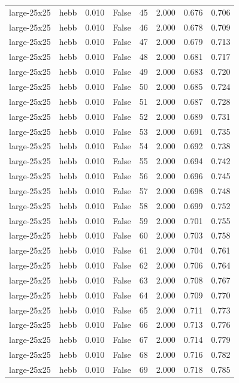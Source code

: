 \begin{tabular}{llrrrrrr}
large-25x25 & hebb & 0.010 & False & 45 & 2.000 & 0.676 & 0.706 \\
large-25x25 & hebb & 0.010 & False & 46 & 2.000 & 0.678 & 0.709 \\
large-25x25 & hebb & 0.010 & False & 47 & 2.000 & 0.679 & 0.713 \\
large-25x25 & hebb & 0.010 & False & 48 & 2.000 & 0.681 & 0.717 \\
large-25x25 & hebb & 0.010 & False & 49 & 2.000 & 0.683 & 0.720 \\
large-25x25 & hebb & 0.010 & False & 50 & 2.000 & 0.685 & 0.724 \\
large-25x25 & hebb & 0.010 & False & 51 & 2.000 & 0.687 & 0.728 \\
large-25x25 & hebb & 0.010 & False & 52 & 2.000 & 0.689 & 0.731 \\
large-25x25 & hebb & 0.010 & False & 53 & 2.000 & 0.691 & 0.735 \\
large-25x25 & hebb & 0.010 & False & 54 & 2.000 & 0.692 & 0.738 \\
large-25x25 & hebb & 0.010 & False & 55 & 2.000 & 0.694 & 0.742 \\
large-25x25 & hebb & 0.010 & False & 56 & 2.000 & 0.696 & 0.745 \\
large-25x25 & hebb & 0.010 & False & 57 & 2.000 & 0.698 & 0.748 \\
large-25x25 & hebb & 0.010 & False & 58 & 2.000 & 0.699 & 0.752 \\
large-25x25 & hebb & 0.010 & False & 59 & 2.000 & 0.701 & 0.755 \\
large-25x25 & hebb & 0.010 & False & 60 & 2.000 & 0.703 & 0.758 \\
large-25x25 & hebb & 0.010 & False & 61 & 2.000 & 0.704 & 0.761 \\
large-25x25 & hebb & 0.010 & False & 62 & 2.000 & 0.706 & 0.764 \\
large-25x25 & hebb & 0.010 & False & 63 & 2.000 & 0.708 & 0.767 \\
large-25x25 & hebb & 0.010 & False & 64 & 2.000 & 0.709 & 0.770 \\
large-25x25 & hebb & 0.010 & False & 65 & 2.000 & 0.711 & 0.773 \\
large-25x25 & hebb & 0.010 & False & 66 & 2.000 & 0.713 & 0.776 \\
large-25x25 & hebb & 0.010 & False & 67 & 2.000 & 0.714 & 0.779 \\
large-25x25 & hebb & 0.010 & False & 68 & 2.000 & 0.716 & 0.782 \\
large-25x25 & hebb & 0.010 & False & 69 & 2.000 & 0.718 & 0.785 \\

\end{tabular}
